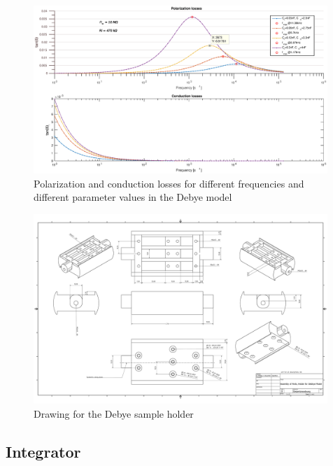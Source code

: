 \begin{figure}
\includegraphics[width=0.99\textwidth]{figures/Method/Dielectric_loss/polarizationmultiple.eps}
    \caption{Polarization and conduction losses for different frequencies and different parameter values in the Debye model}
    \label{fig.debye-modell}
   \end{figure}

   
   \begin{figure}
\includegraphics[width=0.99\textwidth]{figures/Gesamtanordnung.pdf}
    \caption{Drawing for the Debye sample holder}
    \label{fig.CADdrawing}
   \end{figure}

\subsection{Integrator}
\label{sec.integratormethod}
